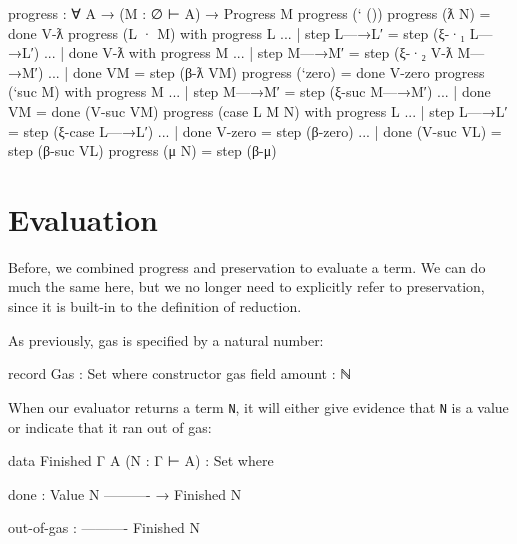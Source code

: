\begin{fence}
\begin{code}
progress : ∀ {A} → (M : ∅ ⊢ A) → Progress M
progress (` ())
progress (ƛ N)                          =  done V-ƛ
progress (L · M) with progress L
...    | step L—→L′                     =  step (ξ-·₁ L—→L′)
...    | done V-ƛ with progress M
...        | step M—→M′                 =  step (ξ-·₂ V-ƛ M—→M′)
...        | done VM                    =  step (β-ƛ VM)
progress (`zero)                        =  done V-zero
progress (`suc M) with progress M
...    | step M—→M′                     =  step (ξ-suc M—→M′)
...    | done VM                        =  done (V-suc VM)
progress (case L M N) with progress L
...    | step L—→L′                     =  step (ξ-case L—→L′)
...    | done V-zero                    =  step (β-zero)
...    | done (V-suc VL)                =  step (β-suc VL)
progress (μ N)                          =  step (β-μ)
\end{code}
\end{fence}

\hypertarget{evaluation}{%
\section{Evaluation}\label{evaluation}}

Before, we combined progress and preservation to evaluate a term. We can
do much the same here, but we no longer need to explicitly refer to
preservation, since it is built-in to the definition of reduction.

As previously, gas is specified by a natural number:

\begin{fence}
\begin{code}
record Gas : Set where
  constructor gas
  field
    amount : ℕ
\end{code}
\end{fence}

When our evaluator returns a term \texttt{N}, it will either give
evidence that \texttt{N} is a value or indicate that it ran out of gas:

\begin{fence}
\begin{code}
data Finished {Γ A} (N : Γ ⊢ A) : Set where

   done :
       Value N
       ----------
     → Finished N

   out-of-gas :
       ----------
       Finished N
\end{code}
\end{fence}

